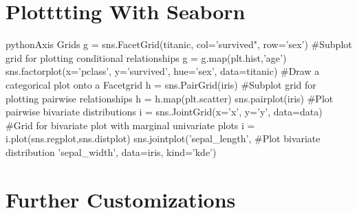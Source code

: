 \section{Plotttting With Seaborn}

\begin{codebox}{python}{Axis Grids}
g = sns.FacetGrid(titanic,
                  col='survived",
                  row='sex')  #Subplot grid for plotting conditional relationships
g = g.map(plt.hist,'age')
sns.factorplot(x='pclass',
               y='survived',
               hue='sex',
               data=titanic)  #Draw a categorical plot onto a Facetgrid
h = sns.PairGrid(iris)  #Subplot grid for plotting pairwise relationships
h = h.map(plt.scatter)
sns.pairplot(iris)  #Plot pairwise bivariate distributions
i = sns.JointGrid(x='x',
                  y='y',
                  data=data)  #Grid for bivariate plot with marginal univariate plots
i = i.plot(sns.regplot,sns.distplot)
sns.jointplot('sepal_length',  #Plot bivariate distribution
              'sepal_width',
              data=iris,
              kind='kde')
\end{codebox}


\section{Further Customizations}


